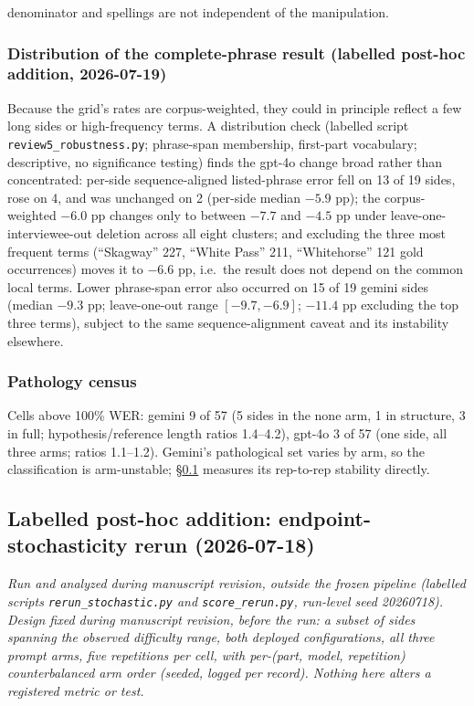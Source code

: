 \documentclass[11pt]{article}
\begin{document}
denominator and spellings are not independent of the manipulation.

\subsubsection*{Distribution of the complete-phrase result (labelled post-hoc addition, 2026-07-19)}

Because the grid's rates are corpus-weighted, they could in principle reflect a few long sides or high-frequency terms. A distribution check (labelled script \texttt{review5\_robustness.py}; phrase-span membership, first-part vocabulary; descriptive, no significance testing) finds the gpt-4o change broad rather than concentrated: per-side sequence-aligned listed-phrase error fell on 13 of 19 sides, rose on 4, and was unchanged on 2 (per-side median $-5.9$ pp); the corpus-weighted $-6.0$ pp changes only to between $-7.7$ and $-4.5$ pp under leave-one-interviewee-out deletion across all eight clusters; and excluding the three most frequent terms (``Skagway'' 227, ``White Pass'' 211, ``Whitehorse'' 121 gold occurrences) moves it to $-6.6$ pp, i.e.\ the result does not depend on the common local terms. Lower phrase-span error also occurred on 15 of 19 gemini sides (median $-9.3$ pp; leave-one-out range $[-9.7, -6.9]$; $-11.4$ pp excluding the top three terms), subject to the same sequence-alignment caveat and its instability elsewhere.

\subsubsection*{Pathology census}

Cells above 100\% WER: gemini 9 of 57 (5 sides in the none arm, 1 in structure, 3 in full; hypothesis/reference length ratios 1.4--4.2), gpt-4o 3 of 57 (one side, all three arms; ratios 1.1--1.2). Gemini's pathological set varies by arm, so the classification is arm-unstable; \S\ref{sec:rerun} measures its rep-to-rep stability directly.

\subsection{Labelled post-hoc addition: endpoint-stochasticity rerun (2026-07-18)}
\label{sec:rerun}

\emph{Run and analyzed during manuscript revision, outside the frozen pipeline (labelled scripts \texttt{rerun\_stochastic.py} and \texttt{score\_rerun.py}, run-level seed 20260718). Design fixed during manuscript revision, before the run: a subset of sides spanning the observed difficulty range, both deployed configurations, all three prompt arms, five repetitions per cell, with per-(part, model, repetition) counterbalanced arm order (seeded, logged per record). Nothing here alters a registered metric or test.}
\end{document}
